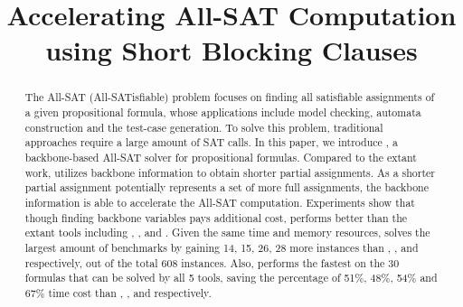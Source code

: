 \documentclass{article}
\begin{document}
\title{Accelerating All-SAT Computation using Short Blocking Clauses }
\maketitle
\begin{abstract}
The All-SAT (All-SATisfiable) problem focuses on finding all satisfiable assignments of a given propositional formula, whose applications include model checking, automata construction and the test-case generation. To solve this problem, traditional approaches require a large amount of SAT calls.
In this paper, we introduce \tool, a backbone-based All-SAT solver for propositional formulas. Compared to the extant work, \tool utilizes backbone information to obtain shorter partial assignments. As a shorter partial assignment potentially represents a set of more full assignments, the backbone information is able to accelerate the All-SAT computation. 
Experiments show that though finding backbone variables pays additional cost, \tool performs better than the extant tools including \ctool, \bc, \nbc and \bdd.
Given the same time and memory resources, \tool solves the largest amount of benchmarks by gaining 14, 15, 26, 28 more instances than \ctool, \bc, \nbc and \bdd respectively, out of the total 608 instances.
Also, \tool performs the fastest on the 30 formulas that can be solved by all 5 tools, saving the percentage of 51\%, 48\%, 54\% and 67\% time cost than \ctool, \bc, \nbc and \bdd respectively.
\end{abstract}








\end{document}
